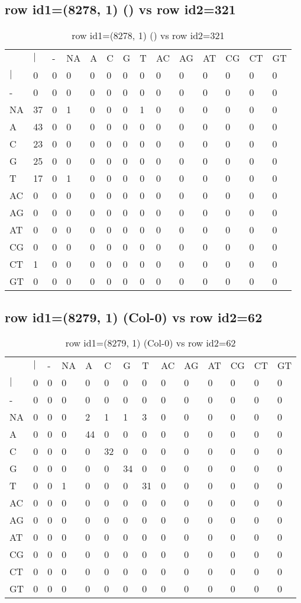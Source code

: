 \subsection{row id1=(8278, 1) () vs row id2=321}
\begin{center}
\begin{longtable}{|l|l|l|l|l|l|l|l|l|l|l|l|l|l|}
\caption{row id1=(8278, 1) () vs row id2=321} \label{table_dm238}\\
\hline
\\
\hline
&$|$&-&NA&A&C&G&T&AC&AG&AT&CG&CT&GT\\
$|$&0&0&0&0&0&0&0&0&0&0&0&0&0\\
-&0&0&0&0&0&0&0&0&0&0&0&0&0\\
NA&37&0&1&0&0&0&1&0&0&0&0&0&0\\
A&43&0&0&0&0&0&0&0&0&0&0&0&0\\
C&23&0&0&0&0&0&0&0&0&0&0&0&0\\
G&25&0&0&0&0&0&0&0&0&0&0&0&0\\
T&17&0&1&0&0&0&0&0&0&0&0&0&0\\
AC&0&0&0&0&0&0&0&0&0&0&0&0&0\\
AG&0&0&0&0&0&0&0&0&0&0&0&0&0\\
AT&0&0&0&0&0&0&0&0&0&0&0&0&0\\
CG&0&0&0&0&0&0&0&0&0&0&0&0&0\\
CT&1&0&0&0&0&0&0&0&0&0&0&0&0\\
GT&0&0&0&0&0&0&0&0&0&0&0&0&0\\
\hline
\end{longtable}
\end{center}

\subsection{row id1=(8279, 1) (Col-0) vs row id2=62}
\begin{center}
\begin{longtable}{|l|l|l|l|l|l|l|l|l|l|l|l|l|l|}
\caption{row id1=(8279, 1) (Col-0) vs row id2=62} \label{table_dm240}\\
\hline
\\
\hline
&$|$&-&NA&A&C&G&T&AC&AG&AT&CG&CT&GT\\
$|$&0&0&0&0&0&0&0&0&0&0&0&0&0\\
-&0&0&0&0&0&0&0&0&0&0&0&0&0\\
NA&0&0&0&2&1&1&3&0&0&0&0&0&0\\
A&0&0&0&44&0&0&0&0&0&0&0&0&0\\
C&0&0&0&0&32&0&0&0&0&0&0&0&0\\
G&0&0&0&0&0&34&0&0&0&0&0&0&0\\
T&0&0&1&0&0&0&31&0&0&0&0&0&0\\
AC&0&0&0&0&0&0&0&0&0&0&0&0&0\\
AG&0&0&0&0&0&0&0&0&0&0&0&0&0\\
AT&0&0&0&0&0&0&0&0&0&0&0&0&0\\
CG&0&0&0&0&0&0&0&0&0&0&0&0&0\\
CT&0&0&0&0&0&0&0&0&0&0&0&0&0\\
GT&0&0&0&0&0&0&0&0&0&0&0&0&0\\
\hline
\end{longtable}
\end{center}


